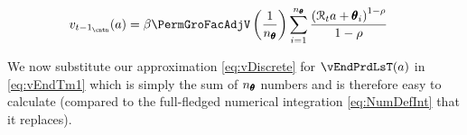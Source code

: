 \documentclass[titlepage, headings=optiontotocandhead]{Resources/texmf-local/tex/latex/econtex}
\begin{document}
\lstset{basicstyle=\ttfamily\footnotesize,breaklines=true,language=Python,frame=single}
\nopagebreak

  \begin{equation}\begin{gathered}\begin{aligned}
        v_{{t-1}_\cntn}(a)  & =   \beta \PermGroFacAdjV\left(\frac{1}{n_{\TranShkEmp}}\right)\sum_{i=1}^{n_{\TranShkEmp}}   \frac{\left(\RNrm_{t} a + \TranShkEmp_{i}\right)^{1-\rho}}{1-\rho} \label{eq:vDiscrete}
      \end{aligned}\end{gathered}\end{equation}

We now substitute our approximation \eqref{eq:vDiscrete} for $\vEndPrdLsT(a)$ in \eqref{eq:vEndTm1} which is simply the sum of $n_{\pmb{\theta}}$ numbers and is therefore easy to calculate (compared to the full-fledged numerical integration \eqref{eq:NumDefInt} that it replaces).




\begin{comment}
  In the {\SMDSOPntbk} notebook, the section ``Discretization of the Income Shock Distribution'' provides code that instantiates the \texttt{DiscreteApproximation} class defined in the \texttt{resources} module. This class creates a 7-point discretization of the continuous log-normal distribution of transitory shocks to income by utilizing seven points, where the mean value is $-.5 \sigma^2$, and the standard deviation is $\sigma = .5$.

  A close look at the \texttt{DiscreteApproximation} class and its subclasses should convince you that the code is simply a computational implementation of the mathematical description of equiprobable discrete approximation in this section. Moreover, the Python code generates a graph of the discretized distribution depicted in \ref{fig:discreteapprox}.
\end{comment}
\end{document}
